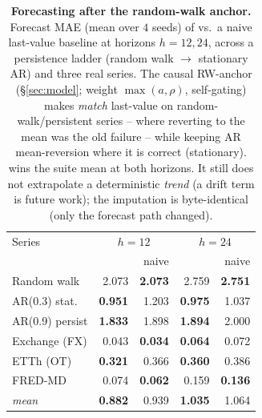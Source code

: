 \begin{table}[t]\centering\small
\setlength{\tabcolsep}{5pt}
\caption{\textbf{Forecasting after the random-walk anchor.} Forecast MAE (mean over $4$ seeds) of \cafe{} vs.\ a naive last-value baseline at horizons $h{=}12,24$, across a persistence ladder (random walk $\to$ stationary AR) and three real series. The causal RW-anchor (\S\ref{sec:model}; weight $\max(a,\rho)$, self-gating) makes \cafe{} \emph{match} last-value on random-walk/persistent series -- where reverting to the mean was the old failure -- while keeping AR mean-reversion where it is correct (stationary). \cafe{} wins the suite mean at both horizons. It still does not extrapolate a deterministic \emph{trend} (a drift term is future work); the imputation is byte-identical (only the forecast path changed).}
\label{tab:forecast}
\begin{tabular}{@{}lrrrr@{}}
\toprule
Series & \multicolumn{2}{c}{$h=12$} & \multicolumn{2}{c}{$h=24$} \\
 & \cafe{} & naive & \cafe{} & naive \\
\midrule
Random walk & 2.073 & \textbf{2.073} & 2.759 & \textbf{2.751} \\
AR(0.3) stat. & \textbf{0.951} & 1.203 & \textbf{0.975} & 1.037 \\
AR(0.9) persist & \textbf{1.833} & 1.898 & \textbf{1.894} & 2.000 \\
Exchange (FX) & 0.043 & \textbf{0.034} & \textbf{0.064} & 0.072 \\
ETTh (OT) & \textbf{0.321} & 0.366 & \textbf{0.360} & 0.386 \\
FRED-MD & 0.074 & \textbf{0.062} & 0.159 & \textbf{0.136} \\
\midrule
\emph{mean} & \textbf{0.882} & 0.939 & \textbf{1.035} & 1.064 \\
\bottomrule
\end{tabular}
\end{table}
